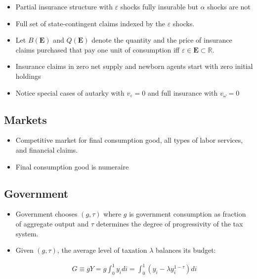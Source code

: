 \documentclass{article}
\newcommand{\R}{\mathbb{R}}
\newcommand{\Ebf}{\mathbf{E}}
\begin{document}
\begin{itemize}

\item Partial insurance structure with $\varepsilon$ shocks fully insurable but $\alpha$ shocks are not

\item Full set of state-contingent claims indexed by the $\varepsilon$ shocks.

\item Let $B(\Ebf)$ and $Q(\Ebf)$ denote the quantity and the price of insurance claims purchased that pay one unit of consumption iff $\varepsilon \in \Ebf \subset \R$.

\item Insurance claims in zero net supply and newborn agents start with zero initial holdings

\item Notice special cases of autarky with $v_\varepsilon = 0$ and full insurance with $v_\omega = 0$

\end{itemize}

\subsection{Markets}

\begin{itemize}

\item Competitive market for final consumption good, all types of labor services, and financial claims.

\item Final consumption good is numeraire

\end{itemize}

\subsection{Government}

\begin{itemize}

\item Government chooses $(g,\tau)$ where $g$ is government consumption as fraction of aggregate output and $\tau$ determines the degree of progressivity of the tax system.

\item Given $(g, \tau)$, the average level of taxation $\lambda$ balances its budget:

\begin{align}
G \equiv gY = g \int_0^1 y_i di = \int_0^1 (y_i - \lambda y_i^{1-\tau}) di \label{gbc}
\end{align}

\end{itemize}
\end{document}
